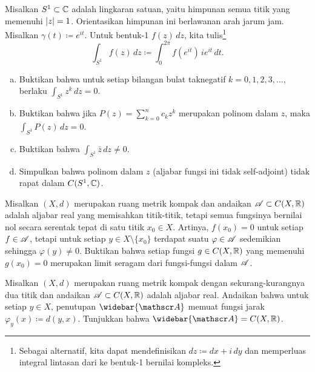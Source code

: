 \begin{exercise} \label{exercise:selfadjointSW}
Misalkan $S^1 \subset {\mathbb{C}}$ adalah lingkaran satuan, yaitu himpunan semua
titik yang memenuhi $\lvert {z} \rvert = 1$.  Orientasikan himpunan ini berlawanan arah jarum jam.
Misalkan $\gamma(t) \coloneqq e^{it}$.
Untuk bentuk-1 $f(z)\,dz$, kita tulis\footnote{%
Sebagai alternatif, kita dapat mendefinisikan $dz \coloneqq dx + i \, dy$ dan
memperluas integral lintasan dari  ke
bentuk-1 bernilai kompleks.}
\begin{equation*}
\int_{S^1} f(z) \,dz \coloneqq \int_0^{2\pi} f(e^{it}) \, i e^{it} \, dt . 
\end{equation*}
\begin{enumerate}[a)]
\item
Buktikan bahwa untuk setiap bilangan bulat taknegatif $k = 0,1,2,3,\ldots$, berlaku
$\int_{S^1} z^k \, dz = 0$.
\item
Buktikan bahwa jika
$P(z) = \sum_{k=0}^n c_k z^k$ merupakan
polinom dalam $z$, maka
$\int_{S^1} P(z) \, dz = 0$.
\item
Buktikan bahwa
$\int_{S^1} \bar{z} \, dz \neq 0$.
\item
Simpulkan bahwa polinom dalam $z$ (aljabar fungsi ini
tidak self-adjoint) tidak rapat dalam $C(S^1,{\mathbb{C}})$.
\end{enumerate}
\end{exercise}

\begin{exercise}
Misalkan $(X,d)$ merupakan ruang metrik kompak dan
andaikan ${\mathscr{A}} \subset C(X,{\mathbb{R}})$ adalah aljabar real yang memisahkan titik-titik, tetapi
semua fungsinya bernilai nol secara serentak tepat di satu titik $x_0 \in X$.
Artinya, $f(x_0) = 0$ untuk setiap $f \in {\mathscr{A}}$,
tetapi untuk setiap $y \in X \setminus \{ x_0 \}$ terdapat
suatu $\varphi \in {\mathscr{A}}$ sedemikian sehingga $\varphi(y) \neq 0$.  Buktikan bahwa
setiap fungsi $g \in C(X,{\mathbb{R}})$ yang memenuhi $g(x_0) = 0$ merupakan limit seragam
dari fungsi-fungsi dalam ${\mathscr{A}}$.
\end{exercise}

\begin{exercise}
Misalkan $(X,d)$ merupakan ruang metrik kompak dengan sekurang-kurangnya dua titik dan
andaikan ${\mathscr{A}} \subset C(X,{\mathbb{R}})$ adalah aljabar real.
Andaikan bahwa untuk setiap $y \in X$, penutupan $\widebar{\sA}$
memuat fungsi jarak $\varphi_y(x) \coloneqq d(y,x)$.
Tunjukkan bahwa $\widebar{\sA} = C(X,\R)$.
\end{exercise}

